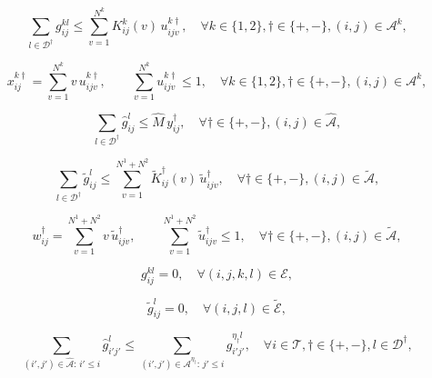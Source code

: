 \documentclass[10pt, reqno]{amsart}
\begin{document}
{\color{red}
\begin{equation}
\sum_{l \in \mathcal{D}^{\dagger}} g_{ij}^{kl} \le \sum_{v=1}^{N^k} K^k_{ij}(v)\, u_{ijv}^{k\dagger}, \quad \forall k \in \{1,2\}, \dagger \in \{+,-\}, (i,j) \in \mathcal{A}^k,\label{m2:BHH}
\end{equation}

\begin{equation}
x_{ij}^{k\dagger} = \sum_{v=1}^{N^k} v\, u_{ijv}^{k\dagger}, \qquad \sum_{v=1}^{N^k} u_{ijv}^{k\dagger} \le 1, \quad \forall k \in \{1,2\}, \dagger \in \{+,-\}, (i,j) \in \mathcal{A}^k,\label{m2:wave link}
\end{equation}

\begin{equation}
\sum_{l\in\mathcal{D}^{\dagger}}\hat{g}_{ij}^l \le \hat{M}\, y_{ij}^{\dagger}, \quad \forall \dagger \in \{+,-\}, (i,j) \in \hat{\mathcal{A}},\label{m2:auto vol}
\end{equation}

\begin{equation}
\sum_{l \in \mathcal{D}^{\dagger}} \tilde{g}_{ij}^l \le \sum_{v=1}^{N^1+N^2} \tilde{K}^{\dagger}_{ij}(v)\, \tilde{u}_{ijv}^{\dagger}, \quad \forall \dagger \in \{+,-\}, (i,j) \in \tilde{\mathcal{A}},\label{m2:direct BHH}
\end{equation}

\begin{equation}
w_{ij}^{\dagger} = \sum_{v=1}^{N^1+N^2} v\, \tilde{u}_{ijv}^{\dagger}, \qquad \sum_{v=1}^{N^1+N^2} \tilde{u}_{ijv}^{\dagger} \le 1, \quad \forall \dagger \in \{+,-\}, (i,j) \in \tilde{\mathcal{A}},\label{m2:direct wave link}
\end{equation}

\begin{equation}
g_{ij}^{kl} = 0, \quad \forall (i,j,k,l) \in \mathcal{E},\label{m2:violate}
\end{equation}

\begin{equation}
\tilde{g}_{ij}^{l} = 0, \quad \forall (i,j,l) \in \tilde{\mathcal{E}},\label{m2:violate direct}
\end{equation}

\begin{equation}
\sum_{(i',j') \in \hat{\mathcal{A}} :\, i' \le i} \hat{g}_{i'j'}^l \le \sum_{(i',j') \in \mathcal{A}^{\eta_{\dagger}} :\, j' \le i} g_{i'j'}^{\eta_{\dagger} l}, \quad \forall i \in \mathcal{T}, \dagger \in \{+,-\}, l \in \mathcal{D}^{\dagger},\label{m2:transfer step 1}
\end{equation}

}
\end{document}
